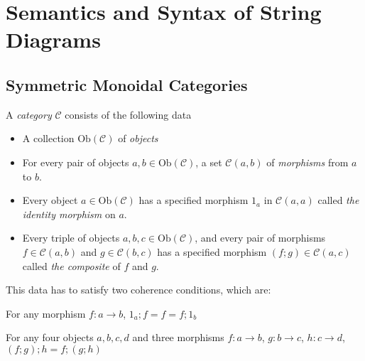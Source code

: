 \section{Semantics and Syntax of String Diagrams}

\subsection{Symmetric Monoidal Categories}

\begin{defn}[Category]
A \emph{category} $\mathcal{C}$ consists of the following data
\begin{itemize}
\item{A collection $\text{Ob}(\mathcal{C})$ of \emph{objects}}
\item{For every pair of objects $a,b \in \text{Ob}(\mathcal{C})$, a set $\mathcal{C}(a,b)$ of \emph{morphisms} from $a$ to $b$.}
\item{Every object $a \in \text{Ob}(\mathcal{C})$ has a specified morphism $1_a$ in $\mathcal{C}(a,a)$ called \emph{the identity morphism} on $a$.}
\item{Every triple of objects $a,b,c \in \text{Ob}(\mathcal{C})$, and every pair of morphisms $f \in \mathcal{C}(a,b)$ and $g \in \mathcal{C}(b,c)$ has a specified morphism $(f;g) \in \mathcal{C}(a,c)$ called \emph{the composite} of $f$ and $g$.}
\end{itemize}
This data has to satisfy two coherence conditions, which are:

 For any morphism $f: a \rightarrow b$, $1_a;f = f = f;1_b$

 For any four objects $a,b,c,d$ and three morphisms $f: a \rightarrow b$, $g: b \rightarrow c$, $h: c \rightarrow d$, $(f;g);h = f;(g;h)$
\end{defn}

\begin{defn}

\end{defn}

\begin{example}

\end{example}

\begin{defn}[Functor]

\end{defn}

\begin{defn}

\end{defn}

